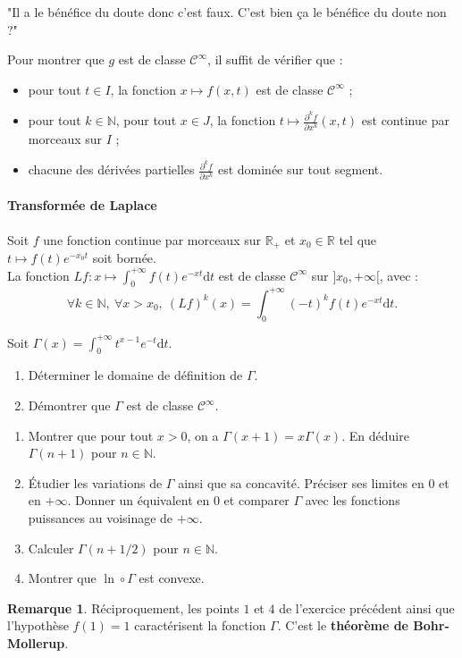 \documentclass[french]{article}
\newcommand{\N}{\mathbb{N}}
\newcommand{\R}{\mathbb{R}}
\renewcommand{\d}{\text{d}}
\theoremstyle{plain}
\theoremstyle{definition}
\newtheorem*{rmq}{Remarque}
\theoremstyle{remark}
\begin{document}
"Il a le bénéfice du doute donc c'est faux. C'est bien ça le bénéfice du doute non ?"

\begin{met}
	Pour montrer que $g$ est de classe $\mathcal{C}^\infty$, il suffit de vérifier que : 
	\begin{itemize}
		\item pour tout $t\in I$, la fonction $x\mapsto f(x,t)$ est de classe $\mathcal{C}^\infty$ ;
		\item pour tout $k\in\N$, pour tout $x\in J$, la fonction $\displaystyle t\mapsto\frac{\partial^k f}{\partial x^k}(x,t)$ est continue par morceaux sur $I$ ;
		\item chacune des dérivées partielles $\displaystyle \frac{\partial^k f}{\partial x^k}$ est dominée sur tout segment.
	\end{itemize}
\end{met}

\paragraph{Transformée de Laplace} Soit $f$ une fonction continue par morceaux sur $\R_+$ et $x_0\in\R$ tel que $t\mapsto f(t)e^{-x_0t}$ soit bornée.\\
La fonction $Lf:x\mapsto\displaystyle\int_{0}^{+\infty}f(t)e^{-xt}\d t$ est de classe $\mathcal{C}^\infty$ sur $]x_0,+\infty[$, avec :
$$\forall k\in\N,\ \forall x>x_0,\ (Lf)^k(x)=\int_{0}^{+\infty}(-t)^kf(t)e^{-xt}\d t.$$

\begin{exo}
	Soit $\Gamma(x)=\displaystyle\int_{0}^{+\infty}t^{x-1}e^{-t}\d t$.
	\begin{enumerate}
		\item Déterminer le domaine de définition de $\Gamma$.
		\item Démontrer que $\Gamma$ est de classe $\mathcal{C}^\infty$.
	\end{enumerate}
\end{exo}

\begin{exo}
	\begin{enumerate}
		\item Montrer que pour tout $x>0$, on a $\Gamma(x+1)=x\Gamma(x)$. En déduire $\Gamma(n+1)$ pour $n\in\N$.
		\item Étudier les variations de $\Gamma$ ainsi que sa concavité. Préciser ses limites en $0$ et en $+\infty$. Donner un équivalent en $0$ et comparer $\Gamma$ avec les fonctions puissances au voisinage de $+\infty$.
		\item Calculer $\Gamma(n+1/2)$ pour $n\in\N$.
		\item Montrer que $\ln\circ\Gamma$ est convexe.
	\end{enumerate}
\end{exo}

\begin{rmq}
	Réciproquement, les points $1$ et $4$ de l'exercice précédent ainsi que l'hypothèse $f(1)=1$ caractérisent la fonction $\Gamma$. C'est le \textbf{théorème de Bohr-Mollerup}.
\end{rmq}
\end{document}
